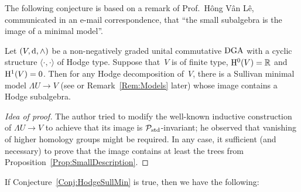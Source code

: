 \documentclass[\MainFolder/Text.tex]{subfiles}
\begin{document}
The following conjecture is based on a remark of Prof.~Hông Vân Lê, communicated in an e-mail correspondence, that ``the small subalgebra is the image of a minimal model''.

\begin{Conjecture}\label{Conj:HodgeSullMin}
Let $(V,\mathrm{d},\wedge)$ be a non-negatively graded unital commutative $\mathrm{DGA}$ with a cyclic structure $\langle\cdot,\cdot\rangle$ of Hodge type. Suppose that~$V$ is of finite type, $\mathrm{H}^0(V) = \mathbb{R}$ and $\mathrm{H}^1(V) = 0$. Then for any Hodge decomposition of~$V$, there is a Sullivan minimal model $\Lambda U \rightarrow V$ (see \cite{Felix2008} or Remark~\ref{Rem:Models} later) whose image contains a Hodge subalgebra. 
\end{Conjecture}
\begin{proof}[Idea of proof] The author tried to modify the well-known inductive construction of $\Lambda U \rightarrow V$ to achieve that its image is $\mathcal{P}_{\mathrm{std}}$-invariant; he observed that vanishing of higher homology groups might be required. In any case, it sufficient (and necessary) to prove that the image contains at least the trees from Proposition~\ref{Prop:SmallDescription}.
\end{proof}

If Conjecture~\ref{Conj:HodgeSullMin} is true, then we have the following:
\end{document}
